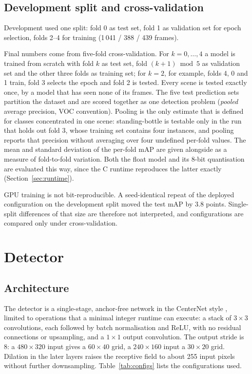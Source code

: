\documentclass[11pt,a4paper]{article}
\begin{document}
\subsection{Development split and cross-validation}

Development used one split: fold 0 as test set, fold 1 as validation set for
epoch selection, folds 2--4 for training (1\,041 / 388 / 439 frames).

Final numbers come from five-fold cross-validation. For $k = 0, \dots, 4$ a
model is trained from scratch with fold $k$ as test set, fold $(k+1) \bmod 5$
as validation set and the other three folds as training set; for $k = 2$,
for example, folds 4, 0 and 1 train, fold 3 selects the epoch and fold 2 is
tested. Every scene is tested exactly once, by a model that has seen none of
its frames. The five test prediction sets partition the dataset and are
scored together as one detection problem (\emph{pooled} average precision,
VOC convention). Pooling is the only estimate that is defined for classes
concentrated in one scene: standing-bottle is testable only in the run that
holds out fold 3, whose training set contains four instances, and pooling
reports that precision without averaging over four undefined per-fold
values. The mean and standard deviation of the per-fold mAP are given
alongside as a measure of fold-to-fold variation. Both the float model and
its 8-bit quantisation are evaluated this way, since the C runtime
reproduces the latter exactly (Section~\ref{sec:runtime}).

GPU training is not bit-reproducible. A seed-identical repeat of the
deployed configuration on the development split moved the test mAP by 3.8
points. Single-split differences of that size are therefore not interpreted,
and configurations are compared only under cross-validation.

\section{Detector}
\label{sec:model}

\subsection{Architecture}

The detector is a single-stage, anchor-free network in the CenterNet style
\cite{zhou2019}, limited to operations that a minimal integer runtime can
execute: a stack of $3 \times 3$ convolutions, each followed by batch
normalisation and ReLU, with no residual connections or upsampling, and a
$1 \times 1$ output convolution. The output stride is 8: a $480 \times 320$
input gives a $60 \times 40$ grid, a $240 \times 160$ input a $30 \times 20$
grid. Dilation in the later layers raises the receptive field to about 255
input pixels without further downsampling. Table~\ref{tab:configs} lists the
configurations used.
\end{document}
